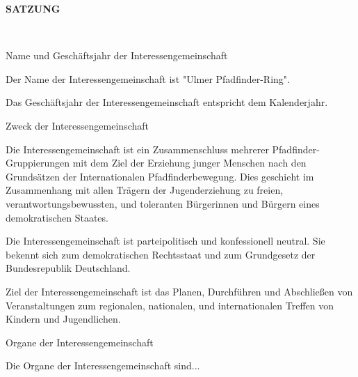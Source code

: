 \begin{Large}
    \textbf{SATZUNG}
\end{Large}
\\

\begin{legal}
    \item Name und Geschäftsjahr der Interessengemeinschaft
        \begin{legal}
            \item Der Name der Interessengemeinschaft ist "Ulmer Pfadfinder-Ring".
            \item Das Geschäftsjahr der Interessengemeinschaft entspricht dem Kalenderjahr.
        \end{legal}
    \item Zweck der Interessengemeinschaft
        \begin{legal}
            \item Die Interessengemeinschaft ist ein Zusammenschluss mehrerer 
                  Pfadfinder-Gruppierungen mit dem Ziel der Erziehung junger Menschen nach den 
                  Grundsätzen der Internationalen Pfadfinderbewegung. Dies geschieht im Zusammenhang 
                  mit allen Trägern der Jugenderziehung zu freien, verantwortungsbewussten, und 
                  toleranten Bürgerinnen und Bürgern eines demokratischen Staates.
            \item Die Interessengemeinschaft ist parteipolitisch und konfessionell neutral. 
                  Sie bekennt sich zum demokratischen Rechtsstaat und zum Grundgesetz der 
                  Bundesrepublik Deutschland.
            \item Ziel der Interessengemeinschaft ist das Planen, Durchführen und Abschließen von 
                  Veranstaltungen zum regionalen, nationalen, und internationalen Treffen von 
                  Kindern und Jugendlichen.
        \end{legal}
    \item Organe der Interessengemeinschaft
        \begin{legal}
            \item Die Organe der Interessengemeinschaft sind...
                \begin{legal}

\end{legal}
\end{legal}
\end{legal}
